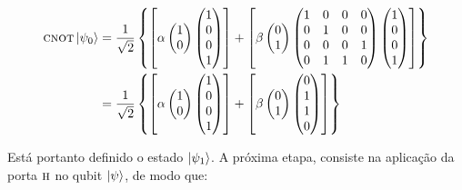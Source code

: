 \begin{align}
\operatorname{\textsc{cnot}} \ket{\psi_0} &= \frac{1}{\sqrt{2}}\left\{\left[\alpha \begin{pmatrix}
1 \\
0 
\end{pmatrix}  \begin{pmatrix}
1 \\
0 \\
0 \\
1
\end{pmatrix}\right] + \left[\beta \begin{pmatrix}
0 \\
1
\end{pmatrix} \begin{pmatrix}
1 & 0 & 0 & 0 \\
0 & 1 & 0 & 0 \\
0 & 0 & 0 & 1 \\
0 & 1 & 1 & 0
\end{pmatrix} 
\begin{pmatrix}
1 \\
0 \\
0 \\
1
\end{pmatrix}\right] \right\} \nonumber \\ 
&=\frac{1}{\sqrt{2}}\left\{\left[\alpha \begin{pmatrix}
1 \\
0 
\end{pmatrix}  \begin{pmatrix}
1 \\
0 \\
0 \\
1
\end{pmatrix}\right] + \left[\beta \begin{pmatrix} 
0 \\
1
\end{pmatrix} \begin{pmatrix}
0 \\
1 \\
1 \\
0
\end{pmatrix}\right]\right\}
\end{align}

Está portanto definido o estado $\ket{\psi_1}$. A próxima etapa, consiste na aplicação da porta \(\operatorname{\textsc{h}}\) no qubit $\ket{\psi}$, de modo que:

